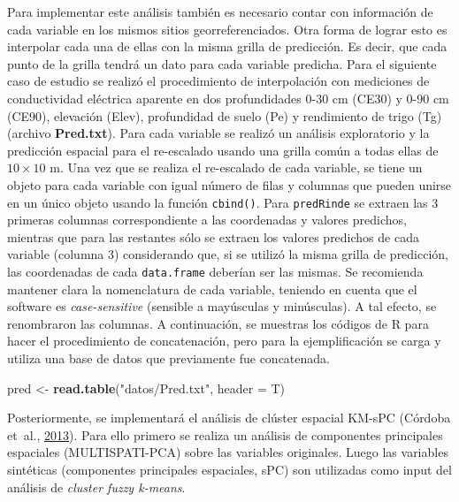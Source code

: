 \documentclass[11pt,b5paper,]{krantz}
\newenvironment{Shaded}{}{}
\newcommand{\KeywordTok}[1]{\textcolor[rgb]{0.00,0.44,0.13}{\textbf{#1}}}
\newcommand{\DataTypeTok}[1]{\textcolor[rgb]{0.56,0.13,0.00}{#1}}
\newcommand{\StringTok}[1]{\textcolor[rgb]{0.25,0.44,0.63}{#1}}
\newcommand{\NormalTok}[1]{#1}
\begin{document}
Para implementar este análisis también es necesario contar con
información de cada variable en los mismos sitios georreferenciados.
Otra forma de lograr esto es interpolar cada una de ellas con la misma
grilla de predicción. Es decir, que cada punto de la grilla tendrá un
dato para cada variable predicha. Para el siguiente caso de estudio se
realizó el procedimiento de interpolación con mediciones de
conductividad eléctrica aparente en dos profundidades 0-30 cm (CE30) y
0-90 cm (CE90), elevación (Elev), profundidad de suelo (Pe) y
rendimiento de trigo (Tg) (archivo \textbf{Pred.txt}). Para cada
variable se realizó un análisis exploratorio y la predicción espacial
para el re-escalado usando una grilla común a todas ellas de
\(10 \times 10\) m. Una vez que se realiza el re-escalado de cada
variable, se tiene un objeto para cada variable con igual número de
filas y columnas que pueden unirse en un único objeto usando la función
\texttt{cbind()}. Para \texttt{predRinde} se extraen las 3 primeras
columnas correspondiente a las coordenadas y valores predichos, mientras
que para las restantes sólo se extraen los valores predichos de cada
variable (columna 3) considerando que, si se utilizó la misma grilla de
predicción, las coordenadas de cada \texttt{data.frame} deberían ser las
mismas. Se recomienda mantener clara la nomenclatura de cada variable,
teniendo en cuenta que el software es \emph{case-sensitive} (sensible a
mayúsculas y minúsculas). A tal efecto, se renombraron las columnas. A
continuación, se muestras los códigos de R para hacer el procedimiento
de concatenación, pero para la ejemplificación se carga y utiliza una
base de datos que previamente fue concatenada.

\begin{Shaded}
\begin{Highlighting}[]
\NormalTok{pred <-}\StringTok{ }\KeywordTok{read.table}\NormalTok{(}\StringTok{"datos/Pred.txt"}\NormalTok{, }
                   \DataTypeTok{header =}\NormalTok{ T)}
\end{Highlighting}
\end{Shaded}

Posteriormente, se implementará el análisis de clúster espacial KM-sPC
(Córdoba et~al., \protect\hyperlink{ref-Cordoba2013}{2013}). Para ello
primero se realiza un análisis de componentes principales espaciales
(MULTISPATI-PCA) sobre las variables originales. Luego las variables
sintéticas (componentes principales espaciales, sPC) son utilizadas como
input del análisis de \emph{cluster fuzzy k-means}.
\end{document}
